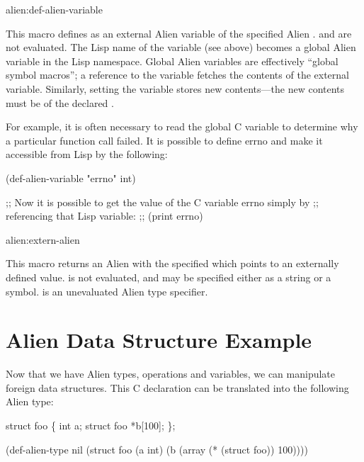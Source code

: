 \begin{defmac}{alien:}{def-alien-variable}{ }
  
  This macro defines  as an external Alien variable of the
  specified Alien .   and  are not
  evaluated.  The Lisp name of the variable (see above) becomes a
  global Alien variable in the Lisp namespace.  Global Alien variables
  are effectively ``global symbol macros''; a reference to the
  variable fetches the contents of the external variable.  Similarly,
  setting the variable stores new contents---the new contents must be
  of the declared .
  
  For example, it is often necessary to read the global C variable
   to determine why a particular function call failed.  It
  is possible to define errno and make it accessible from Lisp by the
  following:
\begin{lisp}
(def-alien-variable "errno" int)

;; Now it is possible to get the value of the C variable errno simply by
;; referencing that Lisp variable:
;;
(print errno)
\end{lisp}
\end{defmac}

\begin{defmac}{alien:}{extern-alien}{ }
  
  This macro returns an Alien with the specified  which
  points to an externally defined value.   is not evaluated,
  and may be specified either as a string or a symbol.   is
  an unevaluated Alien type specifier.
\end{defmac}


\section{Alien Data Structure Example}

Now that we have Alien types, operations and variables, we can manipulate
foreign data structures.  This C declaration can be translated into the
following Alien type:

\begin{lisp}
struct foo \{
    int a;
    struct foo *b[100];
\};

 \myequiv

(def-alien-type nil
  (struct foo
    (a int)
    (b (array (* (struct foo)) 100))))
\end{lisp}

